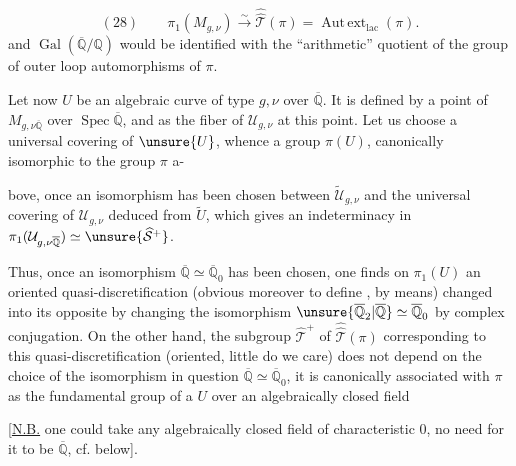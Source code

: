 \[
(28)\qquad \pi_1(M_{g,\nu})\xrightarrow{\sim}\widehat{\widehat{\mathcal T}}(\pi)
=\operatorname{Aut\,ext}_{\mathrm{lac}}(\pi).
\]
and $\operatorname{Gal}(\overline{\mathbb Q}/\mathbb Q)$ would be identified with the ``arithmetic'' quotient of the group of outer loop automorphisms of $\pi$.

Let now $U$ be an algebraic curve of type $g,\nu$ over $\overline{\mathbb Q}$. It is defined by a point of $M_{g,\nu\overline{\mathbb Q}}$ over $\operatorname{Spec}\overline{\mathbb Q}$, and  as the fiber of $\mathcal U_{g,\nu}$ at this point. Let us choose a universal covering of $\unsure{U}$, whence a group $\pi(U)$, canonically isomorphic to the group $\pi$ a-


bove, once an isomorphism has been chosen between $\widetilde{\mathcal U}_{g,\nu}$ and the universal covering of $\mathcal U_{g,\nu}$ deduced from $\widetilde U$, which gives an indeterminacy in $\pi_1(\mathcal U_{g,\nu\overline{\mathbb Q}})\simeq\unsure{\widehat{\mathcal S}^{+}}$.

Thus, once an isomorphism $\overline{\mathbb Q}\simeq\overline{\mathbb Q}_0$ has been chosen, one finds on $\pi_1(U)$ an oriented quasi-discretification (obvious moreover to define , by  means) changed into its opposite by changing the isomorphism $\unsure{\overline{\mathbb Q}_2|\overline{\mathbb Q}}\simeq\overline{\mathbb Q}_0$ by complex conjugation. On the other hand, the subgroup $\widehat{\mathcal T}^{+}$ of $\widehat{\widehat{\mathcal T}}(\pi)$ corresponding to this quasi-discretification (oriented, little do we care) does not depend on the choice of the isomorphism in question $\overline{\mathbb Q}\simeq\overline{\mathbb Q}_0$, it is canonically associated with $\pi$ as the fundamental group of a $U$ over  an algebraically closed field

[\uline{N.B.} one could take any algebraically closed field of characteristic $0$, no need for it to be  $\overline{\mathbb Q}$, cf. below].



